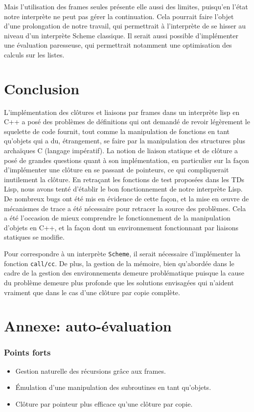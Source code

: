 \documentclass[a4paper,11pt]{article}
\begin{document}
Mais l'utilisation des frames seules présente elle aussi des limites, puisqu'en l'état 
notre interprète ne peut pas gérer la continuation. Cela pourrait faire l'objet d'une 
prolongation de notre travail, qui permettrait à l'interprète de se hisser au niveau 
d'un interprète Scheme classique. Il serait aussi possible d'implémenter une évaluation 
paresseuse, qui permettrait notamment une optimisation des calculs sur les listes.

\section*{Conclusion}

L'implémentation des clôtures et liaisons par frames dans un interprète lisp en
C++ a posé des problèmes de définitions qui ont demandé de revoir légèrement le
squelette de code fournit, tout comme la manipulation de fonctions en tant
qu'objets qui a du, étrangement, se faire par la manipulation des structures
plus archaïques C (langage impératif). La notion de liaison statique et de clôture a posé de
grandes questions quant à son implémentation, en particulier sur la façon
d'implémenter une clôture en se passant de pointeurs, ce qui compliquerait
inutilement la clôture.
En retraçant les fonctions de test proposées dans les TDs Lisp, nous avons tenté
d'établir le bon fonctionnement de notre interprète Lisp. De nombreux bugs ont
été mis en évidence de cette façon, et la mise en œuvre de mécanismes de trace
a été nécessaire pour retracer la source des problèmes. Cela a été l'occasion
de mieux comprendre le fonctionnement de la manipulation d'objets en C++, et la
façon dont un environnement fonctionnant par liaisons statiques se modifie.

Pour correspondre à un interprète \texttt{Scheme}, il serait nécessaire
d'implémenter la fonction \texttt{call/cc}. De plus, la gestion de la mémoire,
bien qu'abordée dans le cadre de la gestion des environnements demeure problématique 
puisque la cause du problème demeure plus profonde que les solutions
envisagées qui n'aident vraiment que dans le cas d'une clôture par copie complète.

\section*{Annexe: auto-évaluation}

\subsubsection*{Points forts}
\begin{itemize}
\item Gestion naturelle des récursions grâce aux frames.
\item Émulation d'une manipulation des subroutines en tant qu'objets.
\item Clôture par pointeur plus efficace qu'une clôture par copie.
\end{itemize}
\end{document}
